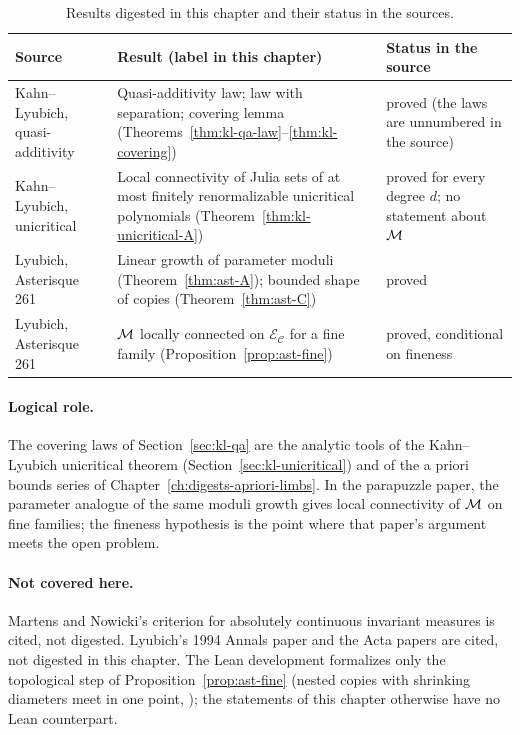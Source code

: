 \begin{table}[ht]
\centering\small
\begin{tabularx}{\textwidth}{@{}>{\raggedright\arraybackslash}p{}>{\raggedright\arraybackslash}X>{\raggedright\arraybackslash}p{}@{}}
\textbf{Source} & \textbf{Result (label in this chapter)} & \textbf{Status in the source}\\
\hline
Kahn--Lyubich, quasi-additivity &
Quasi-additivity law; law with separation; covering lemma (Theorems~\ref{thm:kl-qa-law}--\ref{thm:kl-covering}) &
proved (the laws are unnumbered in the source)\\
Kahn--Lyubich, unicritical &
Local connectivity of Julia sets of at most finitely renormalizable unicritical polynomials (Theorem~\ref{thm:kl-unicritical-A}) &
proved for every degree $d$; no statement about $\mathcal M$\\
Lyubich, Asterisque 261 &
Linear growth of parameter moduli (Theorem~\ref{thm:ast-A}); bounded shape of copies (Theorem~\ref{thm:ast-C}) &
proved\\
Lyubich, Asterisque 261 &
$\mathcal M$ locally connected on $\mathcal E_{\mathcal C}$ for a fine family (Proposition~\ref{prop:ast-fine}) &
proved, conditional on fineness\\
\end{tabularx}
\caption{Results digested in this chapter and their status in the sources.}
\label{tab:digests-iv-summary}
\end{table}

\paragraph{Logical role.}
The covering laws of Section~\ref{sec:kl-qa} are the analytic tools of the Kahn--Lyubich unicritical theorem (Section~\ref{sec:kl-unicritical}) and of the a priori bounds series of Chapter~\ref{ch:digests-apriori-limbs}.  In the parapuzzle paper, the parameter analogue of the same moduli growth gives local connectivity of $\mathcal M$ on fine families; the fineness hypothesis is the point where that paper's argument meets the open problem.

\paragraph{Not covered here.}
Martens and Nowicki's criterion for absolutely continuous invariant measures is cited, not digested.  Lyubich's 1994 Annals paper \cite{LyubichQuasiQuadratic} and the Acta papers \cite{LyubichDynamics} are cited, not digested in this chapter.  The Lean development formalizes only the topological step of Proposition~\ref{prop:ast-fine} (nested copies with shrinking diameters meet in one point, ); the statements of this chapter otherwise have no Lean counterpart.
